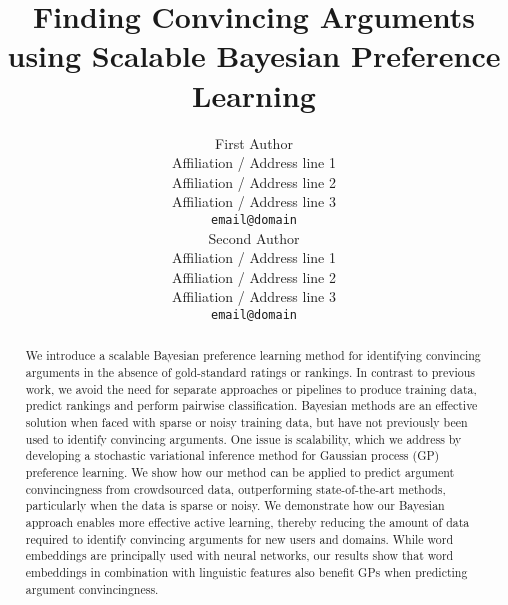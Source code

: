 \documentclass[11pt,letterpaper]{article}
\title{ 
Finding Convincing Arguments using Scalable Bayesian Preference Learning
}
\author{First Author \\
  Affiliation / Address line 1 \\
  Affiliation / Address line 2 \\
  Affiliation / Address line 3 \\
  {\tt email@domain} \\\And
  Second Author \\
  Affiliation / Address line 1 \\
  Affiliation / Address line 2 \\
  Affiliation / Address line 3 \\
  {\tt email@domain} \\}
\date{}
\begin{document}
\maketitle


\begin{abstract}
We introduce a scalable Bayesian preference learning method for identifying
convincing arguments in the absence of gold-standard ratings or rankings.
In contrast to previous work, we avoid the need for separate approaches or pipelines
to produce training data, predict rankings and perform pairwise classification.
Bayesian methods are an effective solution when faced with sparse or noisy training data, 
but have not previously been used to identify convincing arguments.
One issue is scalability, which we address by developing a 
stochastic variational inference method for Gaussian process (GP) preference learning.
We show how our method can be applied to predict argument convincingness from crowdsourced data, 
outperforming state-of-the-art methods, particularly when the data is sparse or noisy.  
We demonstrate how our Bayesian approach enables more effective active learning,
thereby reducing the amount of data required to identify convincing arguments for new users and domains.
While word embeddings are principally used with neural networks, our results show that word embeddings in combination with linguistic features also benefit GPs when predicting
argument convincingness.


\end{abstract}
\end{document}
